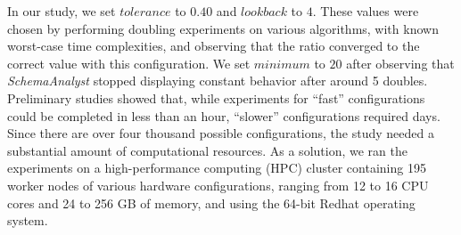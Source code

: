 

In our study, we set $\mathit{tolerance}$ to $0.40$ and $\mathit{lookback}$ to $4$. These values were chosen by
performing doubling experiments on various algorithms, with known worst-case time complexities, and observing that the
ratio converged to the correct value with this configuration.  We set $\mathit{minimum}$ to $20$ after observing that
\textit{SchemaAnalyst} stopped displaying constant behavior after around 5 doubles.  Preliminary studies showed that,
while experiments for ``fast'' configurations could be completed in less than an hour, ``slower'' configurations
required days.  Since there are over four thousand possible configurations, the study needed a substantial amount of
computational resources.  As a solution, we ran the experiments on a high-performance computing (HPC) cluster containing
195 worker nodes of various hardware configurations, ranging from 12 to 16 CPU cores and 24 to 256 GB of memory, and
using the 64-bit Redhat operating system.




